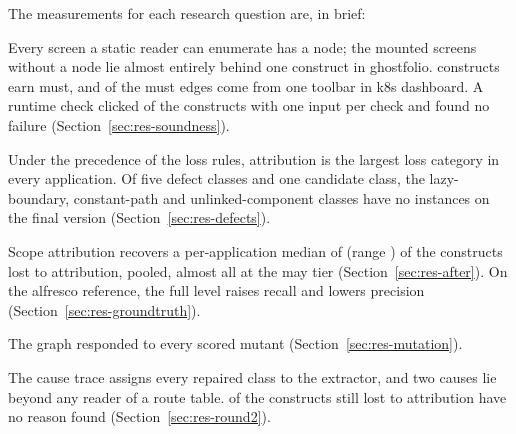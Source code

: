 The measurements for each research question are, in brief:
\begin{description}[nosep,leftmargin=2.6em,labelwidth=2.2em]
\item[RQ1] Every screen a static reader can enumerate has a node; the mounted screens without a
node lie almost entirely behind one construct in ghostfolio. \CensusMustSites{} constructs earn
must, and \CensusMustKdash{} of the \CensusMust{} must edges come from one toolbar in k8s dashboard. A runtime
check clicked \MustRunConfirmedConstructs{} of the constructs with one input per check and found no failure (Section~\ref{sec:res-soundness}).
\item[RQ2] Under the precedence of the loss rules, attribution is the largest loss category in every
application. Of five defect classes and one candidate class, the lazy-boundary, constant-path and
unlinked-component classes have no instances on the final version (Section~\ref{sec:res-defects}).
\item[RQ3] Scope attribution recovers a per-application median of \AttrRecoveredMedian{} (range
\AttrRecoveredRange{}) of the constructs lost to attribution, \AttrRecoveredShare{} pooled, almost
all at the may tier (Section~\ref{sec:res-after}). On the alfresco reference, the full level raises
recall and lowers precision (Section~\ref{sec:res-groundtruth}).
\item[RQ4] The graph responded to every scored mutant (Section~\ref{sec:res-mutation}).
\item[RQ5] The cause trace assigns every repaired class to the extractor, and two causes lie beyond any
reader of a route table. \AttrRemainingUnexplained{} of the \AttrRemaining{} constructs still
lost to attribution have no reason found (Section~\ref{sec:res-round2}).
\end{description}
